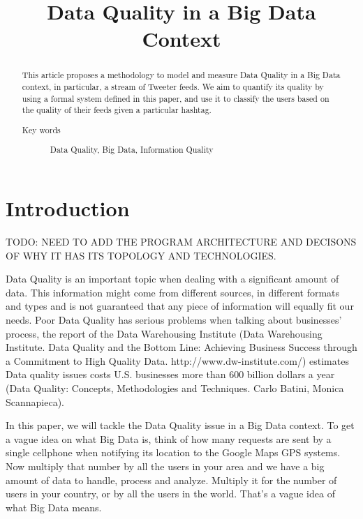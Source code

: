\documentclass[%
 reprint,
 amsmath,amssymb,
 aps,
]{revtex4-1}
\begin{document}

\title{Data Quality in a Big Data Context}%

\begin{abstract}
This article proposes a methodology to model and measure Data Quality in a Big Data context, in particular, a stream of Tweeter feeds. We aim to quantify its quality by using a formal system defined in this paper, and use it to classify the users based on the quality of their feeds given a particular hashtag.
\begin{description}
\item[Key words]
Data Quality, Big Data, Information Quality
\end{description}
\end{abstract}

\maketitle


\section{\label{sec:level1}Introduction}

TODO: NEED TO ADD THE PROGRAM ARCHITECTURE AND DECISONS OF WHY IT HAS ITS TOPOLOGY AND TECHNOLOGIES. 

Data Quality is an important topic when dealing with a significant amount of data. This information might come from different sources, in different formats and types and is not guaranteed that any piece of information will equally fit our needs. Poor Data Quality has serious problems when talking about businesses' process, the report of the Data Warehousing Institute (Data Warehousing Institute. Data Quality and the Bottom Line: Achieving Business Success through a Commitment to High Quality Data. http://www.dw-institute.com/) estimates Data quality issues costs U.S. businesses more than 600 billion dollars a year (Data Quality: Concepts, Methodologies and Techniques. Carlo Batini, Monica Scannapieca).

In this paper, we will tackle the Data Quality issue in a Big Data context. To get a vague idea on what Big Data is, think of how many requests are sent by a single cellphone when notifying its location to the Google Maps GPS systems. Now multiply that number by all the users in your area and we have a big amount of data to handle, process and analyze. Multiply it for the number of users in your country, or by all the users in the world. That's a vague idea of what Big Data means.
\end{document}
